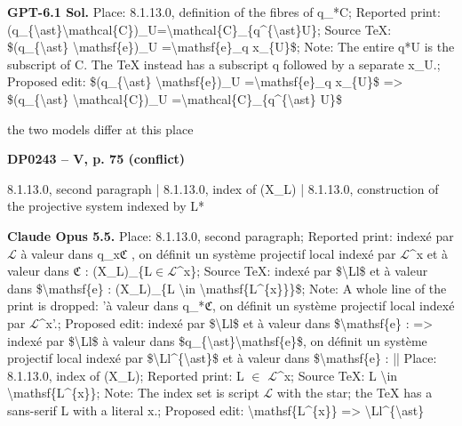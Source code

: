 \textbf{GPT-6.1 Sol.} Place: 8.1.13.0, definition of the fibres of q\_*C; Reported print: (q\_\{\textbackslash{}ast\}\textbackslash{}mathcal\{C\})\_U=\allowbreak \textbackslash{}mathcal\{C\}\_\{q\textasciicircum{}\{\textbackslash{}ast\}U\}; Source TeX: \$(q\_\{\textbackslash{}ast\} \textbackslash{}mathsf\{e\})\_U =\allowbreak  \textbackslash{}mathsf\{e\}\_q x\_\{U\}\$; Note: The entire q*U is the subscript of C. The TeX instead has a subscript q followed by a separate x\_U.; Proposed edit: \$(q\_\{\textbackslash{}ast\} \textbackslash{}mathsf\{e\})\_U =\allowbreak  \textbackslash{}mathsf\{e\}\_q x\_\{U\}\$ =\allowbreak > \$(q\_\{\textbackslash{}ast\} \textbackslash{}mathcal\{C\})\_U =\allowbreak  \textbackslash{}mathcal\{C\}\_\{q\textasciicircum{}\{\textbackslash{}ast\} U\}\$\par
the two models differ at this place\par
\par\noindent\hypertarget{DP0243}{}\textbf{DP0243 -- V, p. 75 (conflict)}\par
8.1.13.0, second paragraph | 8.1.13.0, index of (X\_L) | 8.1.13.0, construction of the projective system indexed by L*\par
\textbf{Claude Opus 5.5.} Place: 8.1.13.0, second paragraph; Reported print: indexé par \ensuremath{\mathcal{L}} à valeur dans q\_x\ensuremath{\mathfrak{C}} , on définit un système projectif local indexé par \ensuremath{\mathcal{L}}\textasciicircum{}x et à valeur dans \ensuremath{\mathfrak{C}} : (X\_L)\_\{L\ensuremath{\in}\ensuremath{\mathcal{L}}\textasciicircum{}x\}; Source TeX: indexé par \$\textbackslash{}Ll\$ et à valeur dans \$\textbackslash{}mathsf\{e\} : (X\_L)\_\{L \textbackslash{}in \textbackslash{}mathsf\{L\textasciicircum{}\{x\}\}\}\$; Note: A whole line of the print is dropped: 'à valeur dans q\_*\ensuremath{\mathfrak{C}}, on définit un système projectif local indexé par \ensuremath{\mathcal{L}}\textasciicircum{}x'.; Proposed edit: indexé par \$\textbackslash{}Ll\$ et à valeur dans \$\textbackslash{}mathsf\{e\} : =\allowbreak > indexé par \$\textbackslash{}Ll\$ à valeur dans \$q\_\{\textbackslash{}ast\}\textbackslash{}mathsf\{e\}\$, on définit un système projectif local indexé par \$\textbackslash{}Ll\textasciicircum{}\{\textbackslash{}ast\}\$ et à valeur dans \$\textbackslash{}mathsf\{e\} : || Place: 8.1.13.0, index of (X\_L); Reported print: L \ensuremath{\in} \ensuremath{\mathcal{L}}\textasciicircum{}x; Source TeX: L \textbackslash{}in \textbackslash{}mathsf\{L\textasciicircum{}\{x\}\}; Note: The index set is script \ensuremath{\mathcal{L}} with the star; the TeX has a sans-serif L with a literal x.; Proposed edit: \textbackslash{}mathsf\{L\textasciicircum{}\{x\}\} =\allowbreak > \textbackslash{}Ll\textasciicircum{}\{\textbackslash{}ast\}\par
